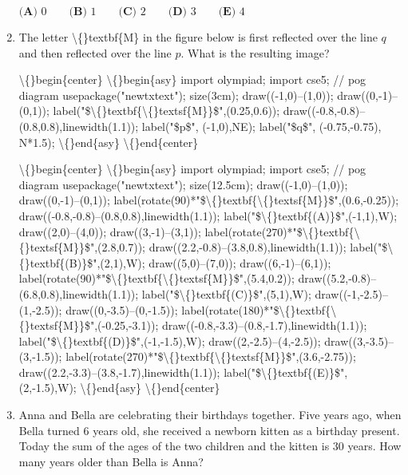 \documentclass{article}
\begin{document}
\begin{enumerate}[label=\arabic*., itemsep=0.5em]
\(\textbf{(A) } 0 \qquad \textbf{(B) } 1\qquad\textbf{(C) } 2\qquad\textbf{(D) } 3\qquad\textbf{(E) } 4\)\par \vspace{0.5em}\item The letter \textbackslash\{\}textbf\{M\} in the figure below is first reflected over the line \(q\) and then reflected over the line \(p\). What is the resulting image?


\textbackslash\{\}begin\{center\}
\textbackslash\{\}begin\{asy\}
import olympiad;
import cse5;
// pog diagram
usepackage("newtxtext");
size(3cm);
draw((-1,0)--(1,0)); draw((0,-1)--(0,1)); label("\$\textbackslash\{\}textbf\{\textbackslash\{\}textsf\{M\}\}\$",(0.25,0.6));
draw((-0.8,-0.8)--(0.8,0.8),linewidth(1.1)); label("\$p\$", (-1,0),NE); label("\$q\$", (-0.75,-0.75), N*1.5);
\textbackslash\{\}end\{asy\}
\textbackslash\{\}end\{center\}



\textbackslash\{\}begin\{center\}
\textbackslash\{\}begin\{asy\}
import olympiad;
import cse5;
// pog diagram
usepackage("newtxtext");
size(12.5cm);
draw((-1,0)--(1,0)); draw((0,-1)--(0,1)); label(rotate(90)*"\$\textbackslash\{\}textbf\{\textbackslash\{\}textsf\{M\}\}\$",(0.6,-0.25));
draw((-0.8,-0.8)--(0.8,0.8),linewidth(1.1)); 
label("\$\textbackslash\{\}textbf\{(A)\}\$",(-1,1),W);
draw((2,0)--(4,0)); draw((3,-1)--(3,1)); label(rotate(270)*"\$\textbackslash\{\}textbf\{\textbackslash\{\}textsf\{M\}\}\$",(2.8,0.7));
draw((2.2,-0.8)--(3.8,0.8),linewidth(1.1)); 
label("\$\textbackslash\{\}textbf\{(B)\}\$",(2,1),W);
draw((5,0)--(7,0)); draw((6,-1)--(6,1)); label(rotate(90)*"\$\textbackslash\{\}textbf\{\textbackslash\{\}textsf\{M\}\}\$",(5.4,0.2));
draw((5.2,-0.8)--(6.8,0.8),linewidth(1.1)); 
label("\$\textbackslash\{\}textbf\{(C)\}\$",(5,1),W);
draw((-1,-2.5)--(1,-2.5)); draw((0,-3.5)--(0,-1.5)); label(rotate(180)*"\$\textbackslash\{\}textbf\{\textbackslash\{\}textsf\{M\}\}\$",(-0.25,-3.1));
draw((-0.8,-3.3)--(0.8,-1.7),linewidth(1.1)); 
label("\$\textbackslash\{\}textbf\{(D)\}\$",(-1,-1.5),W);
draw((2,-2.5)--(4,-2.5)); draw((3,-3.5)--(3,-1.5)); label(rotate(270)*"\$\textbackslash\{\}textbf\{\textbackslash\{\}textsf\{M\}\}\$",(3.6,-2.75));
draw((2.2,-3.3)--(3.8,-1.7),linewidth(1.1)); 
label("\$\textbackslash\{\}textbf\{(E)\}\$",(2,-1.5),W);
\textbackslash\{\}end\{asy\}
\textbackslash\{\}end\{center\}
\par \vspace{0.5em}\item Anna and Bella are celebrating their birthdays together. Five years ago, when Bella turned \(6\) years old, she received a newborn kitten as a birthday present. Today the sum of the ages of the two children and the kitten is \(30\) years. How many years older than Bella is Anna?


\end{enumerate}
\end{document}
